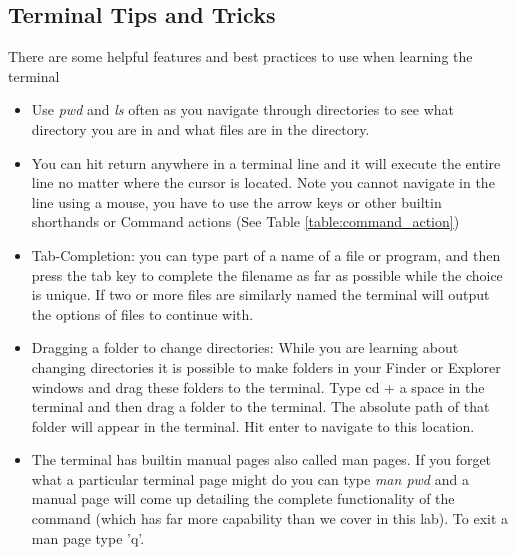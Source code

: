 \documentclass[12pt]{article}
\begin{document}
\subsection{Terminal Tips and Tricks}
There are some helpful features and best practices to use when learning the terminal
\begin{itemize}
\item Use \textit{pwd} and \textit{ls} often as you navigate through directories to see what directory you are in and what files are in the directory.
\item You can hit return anywhere in a terminal line and it will execute the entire line no matter where the cursor is located. Note you cannot navigate in the line using a mouse, you have to use the arrow keys or other builtin shorthands or Command actions (See Table \ref{table:command_action})
  \item Tab-Completion: you can type part of a name of a file or program, and then press the tab key to complete the filename as far as possible while the choice is unique. If two or more files are similarly named the terminal will output the options of files to continue with. 
  \item Dragging a folder to change directories: While you are learning about changing directories it is possible to make folders in your Finder or Explorer windows and drag these folders to the terminal. Type cd + a space in the terminal and then drag a folder to the terminal. The absolute path of that folder will appear in the terminal. Hit enter to navigate to this location. 
    \item The terminal has builtin manual pages also called man pages. If you forget what a particular terminal page might do you can type \textit{man pwd} and a manual page will come up detailing the complete functionality of the command (which has far more capability than we cover in this lab). To exit a man page type 'q'. 
\end{itemize}
\end{document}
